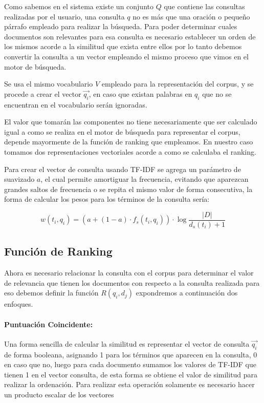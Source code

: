 \documentclass[runningheads,a4paper]{llncs}
\begin{document}
Como sabemos en el sistema existe un conjunto $Q$ que contiene las consultas realizadas por el usuario, una consulta $q$ no es más que una oración o pequeño párrafo empleado para realizar la búsqueda. Para poder determinar cuales documentos son relevantes para esa consulta es necesario establecer un orden de los mismos acorde a la similitud que exista entre ellos por lo tanto debemos convertir la consulta a un vector empleando el mismo proceso que vimos en el motor de búsqueda.

Se usa el mismo vocabulario $V$ empleado para la representación del corpus, y se procede a crear el vector $\overrightarrow{q_i}$, en caso que existan palabras en $q_i$ que no se encuentran en el vocabulario serán ignoradas. 

El valor que tomarán las componentes no tiene necesariamente que ser calculado igual a como se realiza en el motor de búsqueda para representar el corpus, depende mayormente de la función de ranking que empleamos. En nuestro caso tomamos dos representaciones vectoriales acorde a como se calculaba el ranking.

Para crear el vector de consulta usando TF-IDF se agrega un parámetro de suavizado $a$, el cual permite amortiguar la frecuencia, evitando que aparezcan grandes saltos de frecuencia o se repita el mismo valor de forma consecutiva, la forma de calcular los pesos para los términos de la consulta sería:

\begin{equation}
	w(t_i, q_i) = \left( a + (1 - a)  · f_s(t_i, q_i) \right) \cdot \log{\frac{|D|}{d_s(t_i) + 1}}	
\end{equation}

\subsection*{Función de Ranking} 

Ahora es necesario relacionar la consulta con el corpus para determinar el valor de relevancia que tienen los documentos con respecto a la consulta realizada para eso debemos definir la función $R(q_i, d_j)$ expondremos a continuación dos enfoques.

\paragraph{Puntuación Coincidente:} Una forma sencilla de calcular la similitud es representar el vector de consulta $\overrightarrow{q_i}$ de forma booleana, asignando 1 para los términos que aparecen en la consulta, 0 en caso que no, luego para cada documento sumamos los valores de TF-IDF que tienen 1 en el vector consulta, de esta forma se obtiene el valor de similitud para realizar la ordenación. Para realizar esta operación solamente es necesario hacer un producto escalar de los vectores
\end{document}

